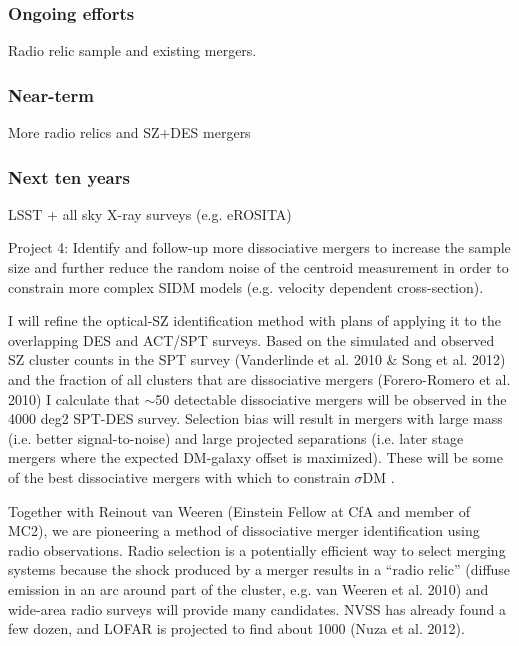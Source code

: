 \subsubsection{Ongoing efforts}

Radio relic sample and existing mergers.

\subsubsection{Near-term}

More radio relics and SZ+DES mergers

\subsubsection{Next ten years}

LSST + all sky X-ray surveys (e.g. eROSITA)

Project 4: Identify and follow-up more dissociative mergers to increase the sample size and further reduce the random noise of the centroid measurement in order to constrain more complex SIDM models (e.g. velocity dependent cross-section).

I will refine the optical-SZ identification method with plans of applying it to the overlapping DES and ACT/SPT surveys.  Based on the simulated and observed SZ cluster counts in the SPT survey (Vanderlinde et al. 2010 \& Song et al. 2012) and the fraction of all clusters that are dissociative mergers (Forero-Romero et al. 2010) I calculate that $\sim$50 detectable dissociative mergers will be observed in the 4000 deg2 SPT-DES survey.  Selection bias will result in mergers with large mass (i.e. better signal-to-noise) and large projected separations (i.e. later stage mergers where the expected DM-galaxy offset is maximized).  These will be some of the best dissociative mergers with which to constrain $\sigma$DM .

Together with Reinout van Weeren (Einstein Fellow at CfA and member of MC2), we are pioneering a method of dissociative merger identification using radio observations.  Radio selection is a potentially efficient way to select merging systems because the shock produced by a merger results in a ``radio relic'' (diffuse emission in an arc around part of the cluster, e.g. van Weeren et al. 2010) and wide-area radio surveys will provide many candidates. NVSS has already found a few dozen, and LOFAR is projected to find about 1000 (Nuza et al. 2012).

